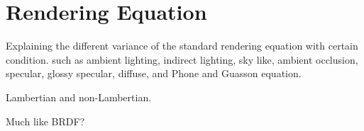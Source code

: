 \chapter{Rendering Equation}

Explaining the different variance of the standard rendering equation with certain condition. such as ambient lighting, indirect lighting, sky like, ambient occlusion, specular, glossy specular, diffuse, and Phone and Guasson equation.

Lambertian and non-Lambertian.

Much like BRDF? 